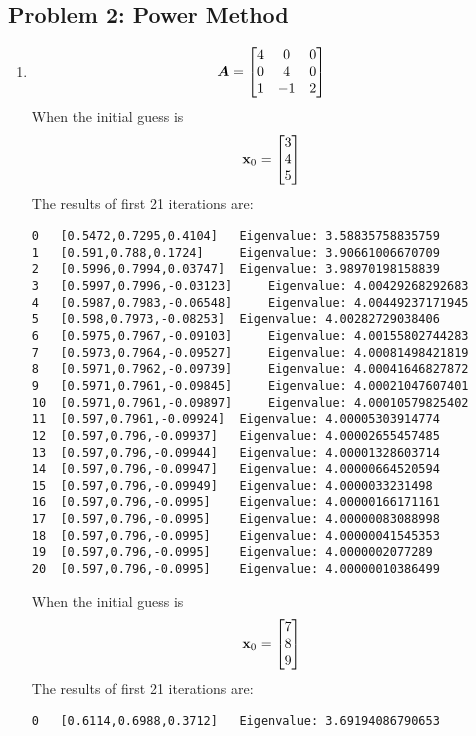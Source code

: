 \documentclass{article}
\begin{document}
\hypertarget{problem_0_homework_checklist_2}{}
\subsection*{{Problem 2: Power Method}}
\label{}

\begin{enumerate}
\item 
\begin{align}
\boldsymbol{A} = \begin{bmatrix} 4 & 0 & 0  \\ 
0 & 4 & 0  \\ 
1 & -1 & 2  \\  \end{bmatrix}
\end{align}
When the initial guess is 
\begin{align}
\boldsymbol{\mathrm{x}}_0=\begin{bmatrix} 3 \\ 4 \\ 5 \end{bmatrix}
\end{align}
The results of first 21 iterations are: 
\begin{verbatim} 
0	[0.5472,0.7295,0.4104]	 Eigenvalue: 3.58835758835759
1	[0.591,0.788,0.1724]	 Eigenvalue: 3.90661006670709
2	[0.5996,0.7994,0.03747]	 Eigenvalue: 3.98970198158839
3	[0.5997,0.7996,-0.03123]	 Eigenvalue: 4.00429268292683
4	[0.5987,0.7983,-0.06548]	 Eigenvalue: 4.00449237171945
5	[0.598,0.7973,-0.08253]	 Eigenvalue: 4.00282729038406
6	[0.5975,0.7967,-0.09103]	 Eigenvalue: 4.00155802744283
7	[0.5973,0.7964,-0.09527]	 Eigenvalue: 4.00081498421819
8	[0.5971,0.7962,-0.09739]	 Eigenvalue: 4.00041646827872
9	[0.5971,0.7961,-0.09845]	 Eigenvalue: 4.00021047607401
10	[0.5971,0.7961,-0.09897]	 Eigenvalue: 4.00010579825402
11	[0.597,0.7961,-0.09924]	 Eigenvalue: 4.00005303914774
12	[0.597,0.796,-0.09937]	 Eigenvalue: 4.00002655457485
13	[0.597,0.796,-0.09944]	 Eigenvalue: 4.00001328603714
14	[0.597,0.796,-0.09947]	 Eigenvalue: 4.00000664520594
15	[0.597,0.796,-0.09949]	 Eigenvalue: 4.0000033231498
16	[0.597,0.796,-0.0995]	 Eigenvalue: 4.00000166171161
17	[0.597,0.796,-0.0995]	 Eigenvalue: 4.00000083088998
18	[0.597,0.796,-0.0995]	 Eigenvalue: 4.00000041545353
19	[0.597,0.796,-0.0995]	 Eigenvalue: 4.0000002077289
20	[0.597,0.796,-0.0995]	 Eigenvalue: 4.00000010386499
\end{verbatim}
When the initial guess is 
\begin{align}
\boldsymbol{\mathrm{x}}_0=\begin{bmatrix} 7 \\ 8 \\ 9 \end{bmatrix}
\end{align}
The results of first 21 iterations are: 
\begin{verbatim} 
0	[0.6114,0.6988,0.3712]	 Eigenvalue: 3.69194086790653

\end{verbatim}
\end{enumerate}
\end{document}

